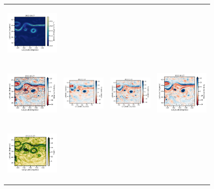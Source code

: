 \begin{figure}[t!]
\begin{center}
\begin{tabular}{cccc}
\includegraphics[width=4.0cm,height=3cm]{00_Oceanbench/content/figures/maps/ke/dc20a/nadir4/dc20a_4dvarnet_ke.png}  \\
\vspace{-2mm}
\includegraphics[trim={0 0 42mm 0},clip, width=3.20cm,height=3cm]{00_Oceanbench/content/figures/maps/rvort/dc20a/nadir4/dc20a_nemo_vort_r.png} &
\includegraphics[trim={0 0 42mm 0},clip, width=3.2cm,height=3cm]{00_Oceanbench/content/figures/maps/rvort/dc20a/nadir4/dc20a_miost_vort_r.png} &
\includegraphics[trim={0 0 42mm 0},clip, width=3.2cm,height=3cm]{00_Oceanbench/content/figures/maps/rvort/dc20a/nadir4/dc20a_bfnqg_vort_r.png} &
\includegraphics[width=4.0cm,height=3cm]{00_Oceanbench/content/figures/maps/rvort/dc20a/nadir4/dc20a_4dvarnet_vort_r.png}  \\
\includegraphics[trim={0 0 38mm 0},clip, width=3.20cm,height=3cm]{00_Oceanbench/content/figures/maps/strain/dc20a/nadir4/dc20a_nemo_strain.png} &

\end{tabular}
\end{center}
\end{figure}
